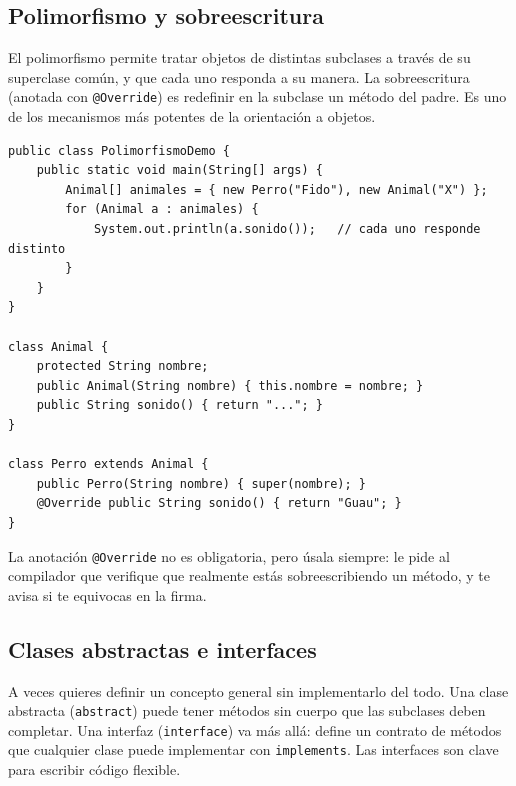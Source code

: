 \documentclass[11pt]{article}
\begin{document}
\subsection{Polimorfismo y sobreescritura}
El polimorfismo permite tratar objetos de distintas subclases a través de su superclase común, y que cada uno responda a su manera. La sobreescritura (anotada con \texttt{@Override}) es redefinir en la subclase un método del padre. Es uno de los mecanismos más potentes de la orientación a objetos.

\begin{cajacodigo}
\begin{lstlisting}[style=java]
public class PolimorfismoDemo {
    public static void main(String[] args) {
        Animal[] animales = { new Perro("Fido"), new Animal("X") };
        for (Animal a : animales) {
            System.out.println(a.sonido());   // cada uno responde distinto
        }
    }
}

class Animal {
    protected String nombre;
    public Animal(String nombre) { this.nombre = nombre; }
    public String sonido() { return "..."; }
}

class Perro extends Animal {
    public Perro(String nombre) { super(nombre); }
    @Override public String sonido() { return "Guau"; }
}
\end{lstlisting}
\end{cajacodigo}
\vspace{2pt}
La anotación \texttt{@Override} no es obligatoria, pero úsala siempre: le pide al compilador que verifique que realmente estás sobreescribiendo un método, y te avisa si te equivocas en la firma.

\subsection{Clases abstractas e interfaces}
A veces quieres definir un concepto general sin implementarlo del todo. Una clase abstracta (\texttt{abstract}) puede tener métodos sin cuerpo que las subclases deben completar. Una interfaz (\texttt{interface}) va más allá: define un contrato de métodos que cualquier clase puede implementar con \texttt{implements}. Las interfaces son clave para escribir código flexible.
\end{document}

